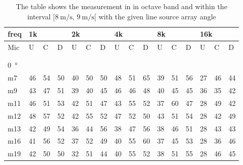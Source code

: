 \begin{table}[H]
\centering
\caption{The table shows the measurement in in octave band and within the interval $[\SI{8}{\meter\per\second},\, \SI{9}{\meter\per\second}[ $ with the given line source array angle}
\begin{tabular}{l|l|l|l|l|l|l|l|l|l|l|l|l|lll}
freq & \multicolumn{3}{l|}{1k} & \multicolumn{3}{l|}{2k} & \multicolumn{3}{l|}{4k} & \multicolumn{3}{l|}{8k} & \multicolumn{3}{l}{16k}                                \\ \hline
Mic  & U      & C      & D     & U      & C      & D     & U      & C      & D     & U      & C      & D     & \multicolumn{1}{l|}{U}  & \multicolumn{1}{l|}{C}  & D  \\ \hline
 & \multicolumn{3}{l|}{} & \multicolumn{3}{l|}{} & \multicolumn{3}{l|}{} & \multicolumn{3}{l|}{} & \multicolumn{3}{l}{}                                \\ 
 \multicolumn{16}{l}{ } \\   
\SI{0}{\degree}   & \multicolumn{3}{l|}{} & \multicolumn{3}{l|}{} & \multicolumn{3}{l|}{} & \multicolumn{3}{l|}{} & \multicolumn{3}{l}{}   \\  \hline
m7   & 46     & 54     & 50    & 40     & 50     & 50    & 48     & 51     & 65    & 39     & 51     & 56    & \multicolumn{1}{l|}{27} & \multicolumn{1}{l|}{46} & 44 \\
m9   & 43     & 47     & 51    & 39     & 40     & 45    & 46     & 46     & 48    & 40     & 45     & 45    & \multicolumn{1}{l|}{36} & \multicolumn{1}{l|}{35} & 42 \\
m11  & 46     & 51     & 53    & 42     & 51     & 47    & 43     & 55     & 52    & 37     & 60     & 47    & \multicolumn{1}{l|}{28} & \multicolumn{1}{l|}{49} & 42 \\
m12  & 48     & 57     & 52    & 42     & 55     & 52    & 47     & 52     & 50    & 43     & 51     & 54    & \multicolumn{1}{l|}{28} & \multicolumn{1}{l|}{42} & 49 \\
m13  & 42     & 49     & 54    & 36     & 44     & 56    & 38     & 47     & 56    & 38     & 46     & 51    & \multicolumn{1}{l|}{28} & \multicolumn{1}{l|}{43} & 43 \\
m16  & 41     & 56     & 52    & 37     & 52     & 49    & 40     & 55     & 60    & 37     & 45     & 53    & \multicolumn{1}{l|}{28} & \multicolumn{1}{l|}{36} & 46 \\
m19  & 42     & 50     & 50    & 32     & 51     & 44    & 40     & 55     & 52    & 38     & 51     & 55    & \multicolumn{1}{l|}{28} & \multicolumn{1}{l|}{46} & 45 \\ \hline

\end{tabular}
\end{table}
